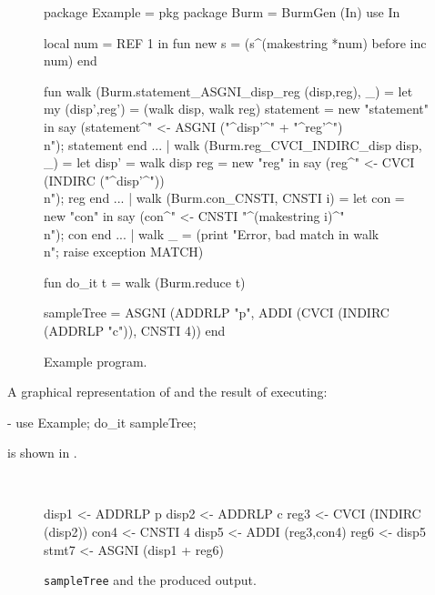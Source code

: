 \begin{figure}
\begin{centercode}
package Example = pkg 
  package Burm = BurmGen (In)
  use In

  local num = REF 1 in
    fun new s = (s^(makestring *num) before inc num)
  end

  fun walk (Burm.statement_ASGNI_disp_reg (disp,reg), _) =
        let
          my (disp',reg') = (walk disp, walk reg)
          statement = new "statement"
        in
          say (statement^" <- ASGNI ("^disp'^" + "^reg'^")\\n"); statement
        end
    ...
    | walk (Burm.reg_CVCI_INDIRC_disp disp, _) =
	let
	  disp' = walk disp
	  reg = new "reg"
	in
	  say (reg^" <- CVCI (INDIRC ("^disp'^"))\\n"); reg
	end
    ...
    | walk (Burm.con_CNSTI, CNSTI i) =
        let
          con = new "con"
        in
          say (con^" <- CNSTI "^(makestring i)^"\\n"); con
        end
    ...
    | walk _ = (print "Error, bad match in walk\\n"; raise exception MATCH)


  fun do_it t = walk (Burm.reduce t)

  sampleTree = ASGNI (ADDRLP "p",
                          ADDI (CVCI (INDIRC (ADDRLP "c")),
                                CNSTI 4))
end
\end{centercode}
 \caption{Example program.}
 \label{ex:prog}
\end{figure}

A graphical representation of  and the result of
executing: 
\begin{code}
    - use Example; do_it sampleTree;
\end{code}
is shown in .

\begin{figure}

\hspace*{\fill}
\hbox{
 \def\epsfsize#1#2{0.8#1}
}
\hspace*{\fill}

\vskip 1in

\begin{centercode}
disp1 <- ADDRLP p
disp2 <- ADDRLP c
reg3 <- CVCI (INDIRC (disp2))
con4 <- CNSTI 4
disp5 <- ADDI (reg3,con4)
reg6 <- disp5
stmt7 <- ASGNI (disp1 + reg6)
\end{centercode}
 \caption{{\tt sampleTree} and the produced output.}
 \label{ex:output}
\end{figure}

